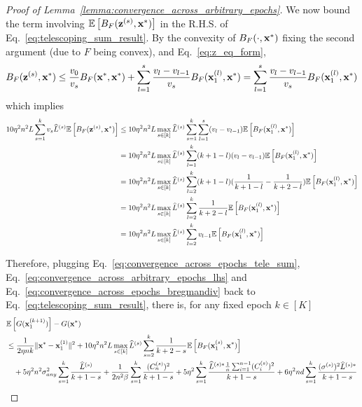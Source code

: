 \begin{proof}[Proof of Lemma~\ref{lemma:convergence_across_arbitrary_epochs}]
    We now bound the term involving $\mathbb{E}\left[B_F({\mathbf{z}}^{(s)}, {\mathbf{x}}^*)\right]$ in the R.H.S. of Eq.~\ref{eq:telescoping_sum_result}. 
    By the convexity of $B_F(\cdot, {\mathbf{x}}^*)$ fixing the second argument (due to $F$ being convex), and Eq.~\ref{eq:z_eq_form}, 
    \begin{align}
        B_F({\mathbf{z}}^{(s)}, {\mathbf{x}}^*) \leq \frac{v_0}{v_s}B_F({\mathbf{x}}^*, {\mathbf{x}}^*) + \sum_{l=1}^{s}\frac{v_l - v_{l-1}}{v_s}B_F({\mathbf{x}}_1^{(l)}, {\mathbf{x}}^*)
        = \sum_{l=1}^{s}\frac{v_l - v_{l-1}}{v_s}B_F({\mathbf{x}}_1^{(l)}, {\mathbf{x}}^*)
    \end{align}
    which implies
    \begin{align}
        10 \eta^2n^2 L \sum_{s=1}^{k} v_s \widehat{L}^{(s)} \mathbb{E}\left[B_F({\mathbf{z}}^{(s)}, {\mathbf{x}}^*)\right]
        &\leq 10 \eta^2 n^2
        L \max_{s\in[k]}\widehat{L}^{(s)}
        \sum_{s=1}^{k} \sum_{l=1}^{s} (v_l - v_{l-1})\mathbb{E}\left[B_F({\mathbf{x}}_1^{(l)}, {\mathbf{x}}^*)\right]\\
        &= 10 \eta^2 n^2 L \max_{s\in[k]}\widehat{L}^{(s)}
        \sum_{l=1}^{k} (k+1-l)(v_l - v_{l-1}) \mathbb{E}\left[B_F({\mathbf{x}}_1^{(l)}, {\mathbf{x}}^*)\right] \\
        &= 10 \eta^2 n^2 L \max_{s\in[k]}\widehat{L}^{(s)}
        \sum_{l=2}^{k} (k+1-l)(\frac{1}{k+1-l} - \frac{1}{k+2-l}) \mathbb{E}\left[B_F({\mathbf{x}}_1^{(l)}, {\mathbf{x}}^*)\right] \\
        &= 10 \eta^2 n^2 L \max_{s\in[k]}\widehat{L}^{(s)} \sum_{l=2}^{k} \frac{1}{k+2-l} \mathbb{E}\left[B_F({\mathbf{x}}_1^{(l)}, {\mathbf{x}}^*)\right]\\
    \label{eq:convergence_across_epochs_bregmandiv}
        &= 10 \eta^2 n^2 L \max_{s\in[k]}\widehat{L}^{(s)}   \sum_{l=2}^{k} v_{l-1} \mathbb{E}\left[B_F({\mathbf{x}}_1^{(l)}, {\mathbf{x}}^*)\right]
    \end{align}

    Therefore, plugging Eq.~\ref{eq:convergence_across_epochs_tele_sum}, Eq.~\ref{eq:convergence_across_arbitrary_epochs_lhs} and Eq.~\ref{eq:convergence_across_epochs_bregmandiv} back to Eq.~\ref{eq:telescoping_sum_result}, there is, for any fixed epoch $k\in [K]$
    \begin{align}
        &\mathbb{E}\left[G({\mathbf{x}}_1^{(k+1)})\right] - G({\mathbf{x}}^*)\\
        \nonumber
        &\leq \frac{1}{2\eta n k} \| {\mathbf{x}}^* - {\mathbf{x}}_1^{(1)}\|^2
        + 10 \eta^2 n^2 L\max_{s\in[k]}\widehat{L}^{(s)} \sum_{s=2}^{k} \frac{1}{k+2-s} \mathbb{E}\left[B_F({\mathbf{x}}_1^{(s)}, {\mathbf{x}}^*)\right]\\
        \nonumber
        &\quad + 5\eta^2 n^2 \sigma_{any}^2 \sum_{s=1}^{k} \frac{ \widehat{L}^{(s)} }{k+1-s}
        + \frac{1}{2n^2 \beta}\sum_{s=1}^{k} \frac{ (C_n^{(s)})^2 }{k+1-s}
        + 5\eta^2 \sum_{s=1}^{k} \frac{ \widehat{L}^{(s)*} \frac{1}{n}\sum_{i=1}^{n-1}(C_i^{(s)})^2} {k+1-s}
        + 6\eta^2 nd \sum_{s=1}^{k} \frac{ (\sigma^{(s)})^2 \widehat{L}^{(s)*} }{k+1-s}
    \end{align}



\end{proof}


